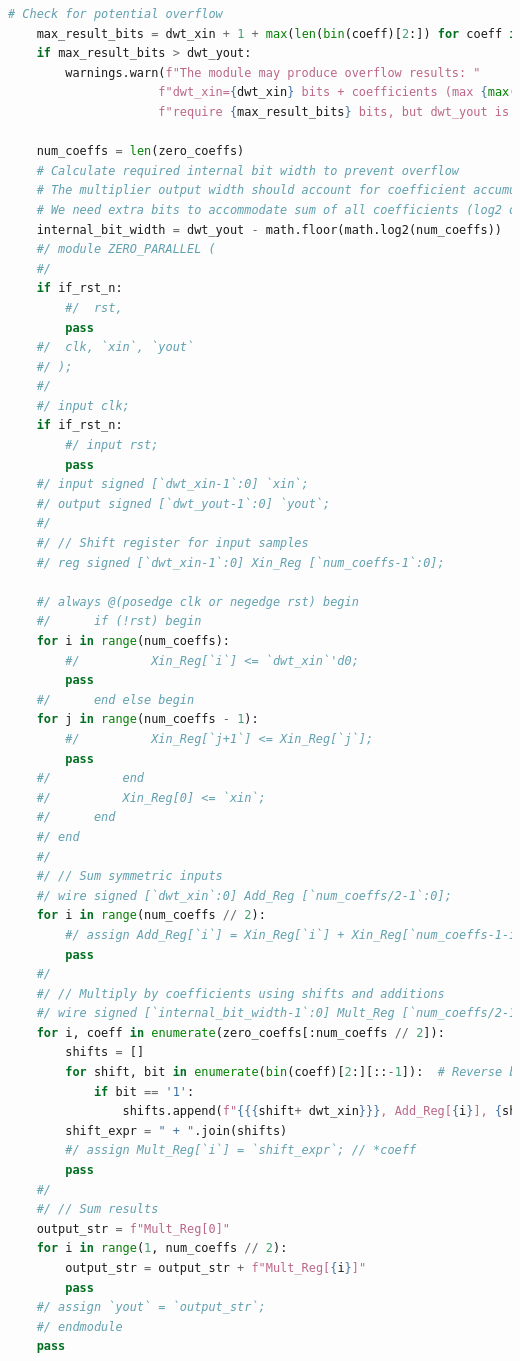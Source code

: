 \begin{lstlisting}[language=python,caption = {IIR滤波器的参数化设计}]
    # Check for potential overflow
    max_result_bits = dwt_xin + 1 + max(len(bin(coeff)[2:]) for coeff in zero_coeffs)  # +1 for the addition
    if max_result_bits > dwt_yout:
        warnings.warn(f"The module may produce overflow results: "
                     f"dwt_xin={dwt_xin} bits + coefficients (max {max(zero_coeffs)}) "
                     f"require {max_result_bits} bits, but dwt_yout is only {dwt_yout} bits.")
                     
    num_coeffs = len(zero_coeffs)
    # Calculate required internal bit width to prevent overflow
    # The multiplier output width should account for coefficient accumulation
    # We need extra bits to accommodate sum of all coefficients (log2 of the number of terms)
    internal_bit_width = dwt_yout - math.floor(math.log2(num_coeffs))
    #/ module ZERO_PARALLEL (
    #/ 
    if if_rst_n:
        #/  rst,
        pass
    #/  clk, `xin`, `yout`
    #/ );
    #/ 
    #/ input clk;
    if if_rst_n:
        #/ input rst;
        pass
    #/ input signed [`dwt_xin-1`:0] `xin`;
    #/ output signed [`dwt_yout-1`:0] `yout`;
    #/ 
    #/ // Shift register for input samples
    #/ reg signed [`dwt_xin-1`:0] Xin_Reg [`num_coeffs-1`:0];
    
    #/ always @(posedge clk or negedge rst) begin
    #/      if (!rst) begin
    for i in range(num_coeffs):
        #/          Xin_Reg[`i`] <= `dwt_xin`'d0;
        pass
    #/      end else begin
    for j in range(num_coeffs - 1):
        #/          Xin_Reg[`j+1`] <= Xin_Reg[`j`];
        pass
    #/          end 
    #/          Xin_Reg[0] <= `xin`;
    #/      end
    #/ end
    #/ 
    #/ // Sum symmetric inputs
    #/ wire signed [`dwt_xin`:0] Add_Reg [`num_coeffs/2-1`:0];
    for i in range(num_coeffs // 2):
        #/ assign Add_Reg[`i`] = Xin_Reg[`i`] + Xin_Reg[`num_coeffs-1-i`];
        pass
    #/ 
    #/ // Multiply by coefficients using shifts and additions
    #/ wire signed [`internal_bit_width-1`:0] Mult_Reg [`num_coeffs/2-1`:0];
    for i, coeff in enumerate(zero_coeffs[:num_coeffs // 2]):
        shifts = []
        for shift, bit in enumerate(bin(coeff)[2:][::-1]):  # Reverse binary representation
            if bit == '1':
                shifts.append(f"{{{shift+ dwt_xin}}}, Add_Reg[{i}], {shift}'d0")
        shift_expr = " + ".join(shifts)
        #/ assign Mult_Reg[`i`] = `shift_expr`; // *coeff
        pass
    #/ 
    #/ // Sum results
    output_str = f"Mult_Reg[0]"
    for i in range(1, num_coeffs // 2):
        output_str = output_str + f"Mult_Reg[{i}]"
        pass
    #/ assign `yout` = `output_str`;
    #/ endmodule
    pass


\end{lstlisting}
